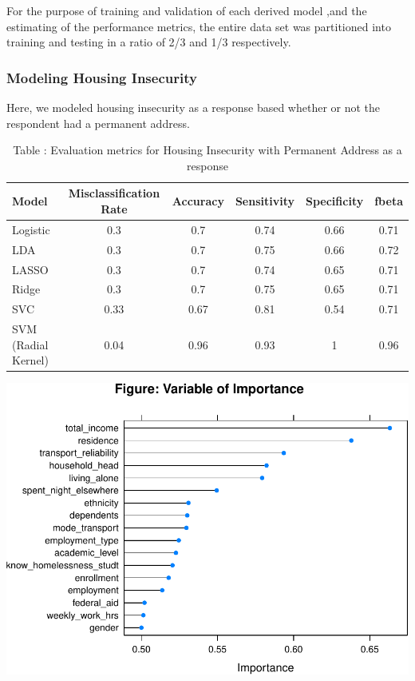\documentclass[
  10pt,
]{article}
\begin{document}
For the purpose of training and validation of each derived model ,and the estimating of the performance metrics, the entire data set was partitioned into training and testing in a ratio of 2/3 and 1/3 respectively.

\hypertarget{modeling-housing-insecurity}{%
\subsubsection{Modeling Housing Insecurity}\label{modeling-housing-insecurity}}

Here, we modeled housing insecurity as a response based whether or not the respondent had a permanent address.

\begin{table}[H]

\caption{\label{tab:unnamed-chunk-10}Table : Evaluation metrics for Housing Insecurity with Permanent Address as a response}
\centering
\fontsize{12}{14}\selectfont
\begin{tabular}[t]{l|c|c|c|c|c}
\hline
Model & Misclassification Rate & Accuracy & Sensitivity & Specificity & fbeta\\
\hline
Logistic & 0.3 & 0.7 & 0.74 & 0.66 & 0.71\\
\hline
LDA & 0.3 & 0.7 & 0.75 & 0.66 & 0.72\\
\hline
LASSO & 0.3 & 0.7 & 0.74 & 0.65 & 0.71\\
\hline
Ridge & 0.3 & 0.7 & 0.75 & 0.65 & 0.71\\
\hline
SVC & 0.33 & 0.67 & 0.81 & 0.54 & 0.71\\
\hline
SVM (Radial Kernel) & 0.04 & 0.96 & 0.93 & 1 & 0.96\\
\hline
\end{tabular}
\end{table}

\includegraphics{phase1_report_files/figure-latex/unnamed-chunk-10-1}
\end{document}
